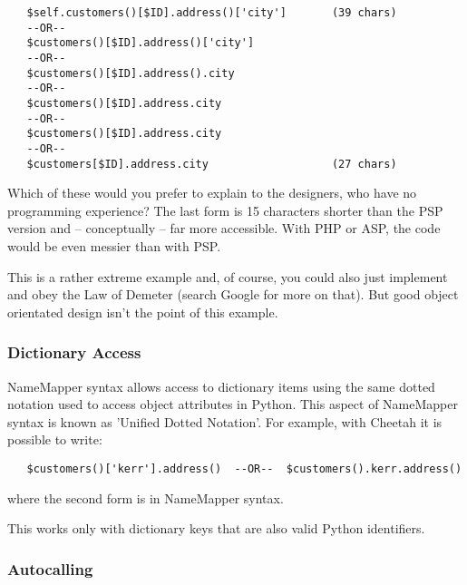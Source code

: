 \begin{verbatim}
   $self.customers()[$ID].address()['city']       (39 chars)
   --OR--                                         
   $customers()[$ID].address()['city']           
   --OR--                                         
   $customers()[$ID].address().city              
   --OR--                                         
   $customers()[$ID].address.city                
   --OR--                                         
   $customers()[$ID].address.city
   --OR--
   $customers[$ID].address.city                   (27 chars)                     
\end{verbatim}   

Which of these would you prefer to explain to the designers, who have no
programming experience?  The last form is 15 characters shorter than the PSP
version and -- conceptually -- far more accessible. With PHP or ASP, the
code would be even messier than with PSP.

This is a rather extreme example and, of course, you could also just implement
 and obey the Law of Demeter (search Google for more
on that).  But good object orientated design isn't the point of this example.

\subsubsection{Dictionary Access}
\label{language.namemapper.dict}

NameMapper syntax allows access to dictionary items using the same dotted
notation used to access object attributes in Python.  This aspect of NameMapper
syntax is known as 'Unified Dotted Notation'.
For example, with Cheetah it is possible to write:
\begin{verbatim}
   $customers()['kerr'].address()  --OR--  $customers().kerr.address()
\end{verbatim}
where the second form is in NameMapper syntax.

This works only with dictionary keys that are also valid Python identifiers.

\subsubsection{Autocalling}
\label{language.namemapper.autocalling}

